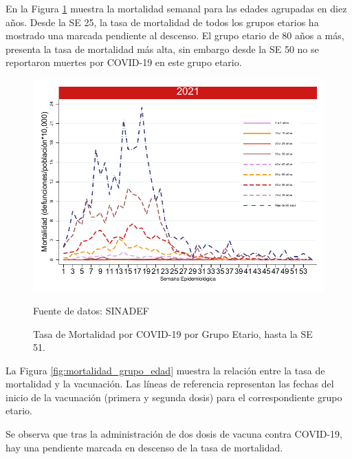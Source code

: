 \documentclass[12pt,a4paper,openany]{book}
\begin{document}
	\noindent En la Figura \ref{fig:mortalidad_edad} muestra la mortalidad semanal para las edades agrupadas en diez años. Desde la SE 25, la tasa de mortalidad de todos los grupos etarios ha mostrado una marcada pendiente al descenso. El grupo etario de 80 años a más, presenta la tasa de mortalidad más alta, sin embargo desde la SE 50 no se reportaron muertes por COVID-19 en este grupo etario. 	
	\begin{figure}[h]
	\caption{Tasa de Mortalidad por COVID-19 por Grupo Etario, hasta la SE 51.}\label{fig:mortalidad_edad}
	\begin{center}
		\includegraphics[width=0.65\linewidth]{../figuras/mortalidad_edad.pdf}
	\end{center}
	{\footnotesize Fuente de datos: SINADEF} 
	\end{figure}


	La Figura \ref{fig:mortalidad_grupo_edad} muestra la relación entre la tasa de mortalidad y la vacunación. Las líneas de referencia representan las fechas del inicio de la vacunación (primera y segunda dosis) para el correspondiente grupo etario. 
	
	Se observa que tras la administración de dos dosis de vacuna contra COVID-19,  hay una pendiente marcada en descenso de la tasa de mortalidad. 
\end{document}
